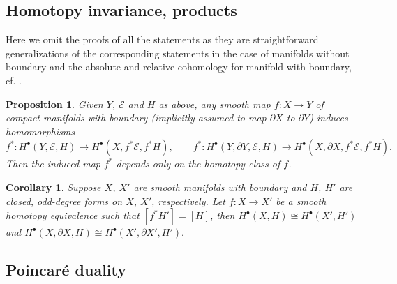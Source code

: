 \documentclass[12pt]{amsart}
\theoremstyle{plain}
\newtheorem{proposition}[theorem]{Proposition}
\newtheorem{corollary}[theorem]{Corollary}
\theoremstyle{definition}
\theoremstyle{remark}
\begin{document}
\subsection{Homotopy invariance, products} Here we omit the proofs of all the statements as they are 
straightforward generalizations of the corresponding statements in the case of manifolds without boundary
\cite{MW,MW2} and the absolute and relative cohomology for manifold with boundary, cf. \cite{GilkeyBook,Schwarz}.

\begin{proposition}\label{prop:homotopy}
Given ${{Y}}$, ${\mathcal E}$ and $H$ as above, any smooth map $f\colon {{X\to Y}}$
of compact manifolds with boundary (implicitly assumed to map $\partial X$ to $\partial Y$) induces homomorphisms
$$
f^*\colon H^\bullet({{Y}},{\mathcal E},H)\to H^\bullet({{X}},f^*{\mathcal E},f^*H), \qquad 
f^*\colon H^\bullet(Y, \partial Y, {\mathcal E},H) \to H^\bullet({{X}},\partial X, f^*{\mathcal E},f^*H).
$$
Then the induced map $f^*$ depends only on the homotopy class of $f$.
\end{proposition}

\begin{corollary}\label{cor:hmtp}
Suppose $X$, $X'$ are smooth manifolds with boundary and $H$, $H'$ are closed, odd-degree
forms on $X$, $X'$, respectively. Let  $f\colon X\to X'$ be a smooth homotopy equivalence such that
$[f^*H']=[H]$, then $H^\bullet(X,H)\cong H^\bullet(X',H')$ and
 $H^\bullet(X,\partial X, H)\cong H^\bullet(X', \partial X', H').$
\end{corollary}

\subsection{Poincar\'e duality}
\end{document}
